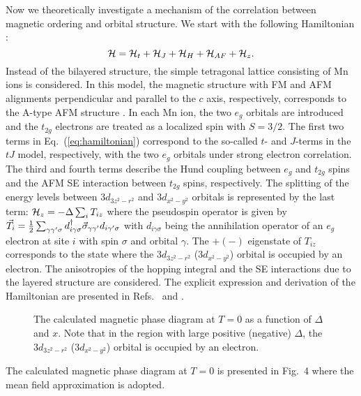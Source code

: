 \par
Now we theoretically investigate a mechanism of the correlation between
magnetic ordering and orbital structure.
We start with the following Hamiltonian \cite{ishihara,ishihara2,hamiltonian}:
\begin{equation}
{\cal{H}}={\cal{H}}_t+{\cal{H}}_J+{\cal{H}}_H+{\cal{H}}_{AF}+{\cal{H}}_z .
\label{eq:hamiltonian}
\end{equation}
Instead of the bilayered structure,
the simple tetragonal lattice consisting of Mn ions is considered.
In this model, the magnetic structure with FM and AFM
alignments perpendicular and parallel to the $c$ axis, respectively,
corresponds to the A-type AFM structure \cite{aafm}.
In each Mn ion, the two $e_g$ orbitals are introduced and
the $t_{2g}$ electrons are treated as a localized spin with $S=3/2$.
The first two terms in Eq.~(\ref{eq:hamiltonian}) correspond to the so-called $t$- and $J$-terms
in the $tJ$ model, respectively, with the two $e_g$ orbitals under strong electron correlation.
The third and fourth terms describe the Hund coupling between $e_g$ and $t_{2g}$ spins
and the AFM SE interaction between $t_{2g}$ spins, respectively.
The splitting of the energy levels between $3d_{3z^2-r^2}$ and $3d_{x^2-y^2}$
orbitals is represented by the last term:
$
{\cal{H}}_z=-\Delta \sum_i T_{iz}
$
where the pseudospin operator is given by
$\vec{T}_{i}={1 \over 2} \sum_{\gamma \gamma' \sigma}
d_{i \gamma \sigma}^\dagger \vec{\sigma}_{\gamma \gamma'} d_{i \gamma' \sigma}$
with $d_{i \gamma \sigma}$ being the annihilation operator of an $e_g$ electron
at site $i$ with spin $\sigma$ and orbital $\gamma$.
The $+(-)$ eigenstate of $T_{iz}$ corresponds to the state where
the $3d_{3z^2-r^2}$ ($3d_{x^2-y^2}$) orbital is occupied by an electron.
The anisotropies of the hopping integral and the SE interactions
due to the layered structure are considered.
The explicit expression and derivation of the Hamiltonian are
presented in Refs.~\cite{ishihara} and \cite{ishihara2}.
\par
\begin{figure}
\columnwidth
\centerline{}
\caption{The calculated magnetic phase diagram at $T=0$ as a function of $\Delta$ and $x$.  Note that in the region with large positive (negative) $\Delta$,  the $3d_{3z^2-r^2}$ ($3d_{x^2-y^2}$) orbital is occupied by an electron. }
\label{fig:fig4}
\end{figure}
The calculated magnetic phase diagram at $T=0$ is presented in Fig.~4 \cite{hamiltonian,maezono}
where the mean field approximation is adopted.
